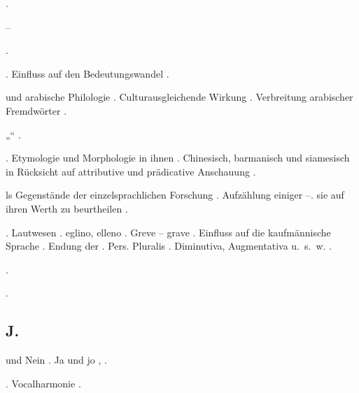 \begin{register}
 \pageref{sp.321}.

 \pageref{sp.101}–\pageref{sp.102}


 \sed{\pageref{sp.390},} \pageref{sp.423}.

. Einfluss auf den Bedeutungswandel \pageref{sp.244}.

 und arabische Philologie \pageref{sp.21}. Culturausgleichende Wirkung \pageref{sp.148}. Verbreitung arabischer Fremdwörter \pageref{sp.231}.

„“ \pageref{sp.215}.


 \sed{\pageref{sp.257}}. Etymologie und Morphologie in ihnen \pageref{sp.123}. Chinesisch, barmanisch und siamesisch in Rücksicht auf attributive und prädicative Anschauung \sed{\pageref{sp.346},} \pageref{sp.456}.

 ls Gegenstände der einzelsprachlichen Forschung \pageref{sp.61}. Aufzählung einiger \pageref{sp.146}–\pageref{sp.147}.  sie auf ihren Werth zu beurtheilen \pageref{sp.426}.

. Lautwesen \pageref{sp.34}.  eglino, elleno \pageref{sp.214}. Greve – grave \pageref{sp.222}. Einfluss auf die kaufmännische Sprache \pageref{sp.265}\sed{, \pageref{sp.289}}. Endung der \pageref{sp.3}. Pers. Pluralis \pageref{sp.435}. Diminutiva, Augmentativa u.~s.~w. \pageref{sp.445}.

 \pageref{sp.147}.

 \pageref{sp.445}.


\subsection*{J.}\label{reg.J}

 und Nein \pageref{sp.103}. Ja und jo \pageref{sp.233}, \pageref{sp.285}.

 \pageref{sp.271}.  Vocalharmonie \pageref{sp.402}.


\end{register}
